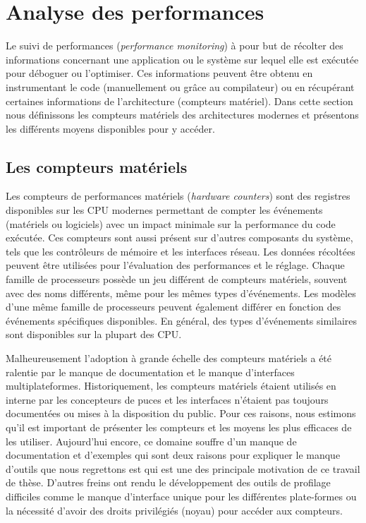 \section{Analyse des performances}


Le suivi de performances (\textit{performance monitoring}) à pour but de récolter des informations concernant une application ou le système sur lequel elle est exécutée pour déboguer ou l'optimiser. Ces informations peuvent être obtenu en instrumentant le code (manuellement ou grâce au compilateur) ou en récupérant certaines informations de l'architecture (compteurs matériel). Dans cette section nous définissons les compteurs matériels des architectures modernes et présentons les différents moyens disponibles pour y accéder.


\subsection{Les compteurs matériels}

    Les compteurs de performances matériels (\textit{hardware counters}) sont des registres disponibles sur les CPU modernes permettant de compter les événements (matériels ou logiciels) avec un impact minimale sur la performance du code exécutée. Ces compteurs sont aussi présent sur d'autres composants du système, tels que les contrôleurs de mémoire et les interfaces réseau. Les données récoltées peuvent être utilisées pour l'évaluation des performances et le réglage. Chaque famille de processeurs possède un jeu différent de compteurs matériels, souvent avec des noms différents, même pour les mêmes types d'événements. Les modèles d'une même famille de processeurs peuvent également différer en fonction des événements spécifiques disponibles. En général, des types d'événements similaires sont disponibles sur la plupart des CPU.

    Malheureusement l'adoption à grande échelle des compteurs matériels a été ralentie par le manque de documentation et le manque d'interfaces multiplateformes. Historiquement, les compteurs matériels étaient utilisés en interne par les concepteurs de puces et les interfaces n'étaient pas toujours documentées ou mises à la disposition du public. Pour ces raisons, nous estimons qu'il est important de présenter les compteurs et les moyens les plus efficaces de les utiliser. Aujourd'hui encore, ce domaine souffre d'un manque de documentation et d'exemples qui sont deux raisons pour expliquer le manque d'outils que nous regrettons est qui est une des principale motivation de ce travail de thèse. D'autres freins ont rendu le développement des outils de profilage difficiles comme le manque d'interface unique pour les différentes plate-formes ou la nécessité d'avoir des droits privilégiés (noyau) pour accéder aux compteurs. 
    
